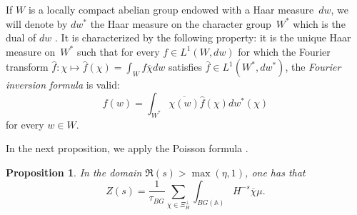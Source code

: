 \documentclass[a4paper,english,12pt]{amsart}
\newcommand{\AAA}{\mathbb A}
\def\no{n\textsuperscript{0}\,}
\newtheorem{prop}[equation]{Proposition}
\numberwithin{equation}{subsection}
\begin{document}
If $W$ is a locally compact abelian group endowed with a Haar measure~$dw$, we will denote by $dw^*$ the Haar measure on the character group~$W^*$ which is the dual of $dw$ \cite[Chapter II, \S 1, \no 3, Definition~4]{TSpectrale}. It is characterized by the following property: it is the unique Haar measure on~$W^*$ such that for every $f\in L^1(W, dw)$ for which the Fourier transform $\widehat f:\chi\mapsto\widehat f(\chi)=\int_{W}f\overline{\chi}dw$ satisfies $\widehat f \in L^1(W^*, dw^*)$, the \textit{Fourier inversion formula} \cite[Chapter II, \S 1, \no 4, Proposition 4]{TSpectrale} is valid: \begin{equation}\label{fourierinversion}f(w)=\int_{W^*}\overline{\chi(w)}\widehat{f}(\chi) dw^*(\chi)
\end{equation} for every $w\in W$.

In the next proposition, we apply the Poisson formula \cite[Chapter II, \S1, \no 8, Proposition 8]{TSpectrale}.
\begin{prop}\label{poisson}
In the domain $\Re(s)>\max(\eta,1)$,  one has that $$Z(s)=\frac{1}{\tau_{BG}}\sum_{\chi \in \Xi_H^{\perp}}\int_{BG(\AAA)}H^{-s}\overline{\chi}\mu.$$ 
\end{prop}
\end{document}
